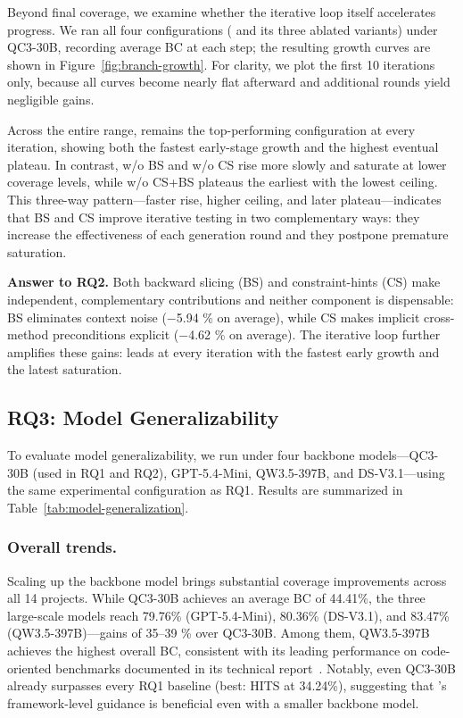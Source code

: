 Beyond final coverage, we examine whether the iterative loop itself accelerates progress. We ran all four configurations (\ourmethod{} and its three ablated variants) under QC3-30B, recording average BC at each step; the resulting growth curves are shown in Figure~\ref{fig:branch-growth}.
For clarity, we plot the first 10 iterations only, because all curves become nearly flat afterward and additional rounds yield negligible gains.

Across the entire range, \ourmethod{} remains the top-performing configuration at every iteration, showing both the fastest early-stage growth and the highest eventual plateau. 
In contrast, w/o BS and w/o CS rise more slowly and saturate at lower coverage levels, while w/o CS+BS plateaus the earliest with the lowest ceiling.
This three-way pattern---faster rise, higher ceiling, and later plateau---indicates that BS and CS improve iterative testing in two complementary ways: they increase the effectiveness of each generation round and they postpone premature saturation. 

\noindent\textbf{Answer to RQ2.}
Both backward slicing (BS) and constraint-hints (CS) make independent, complementary contributions and neither component is dispensable: 
BS eliminates context noise ($-$5.94 \% on average), while CS makes implicit cross-method preconditions explicit ($-$4.62 \% on average). 
The iterative loop further amplifies these gains: \ourmethod{} leads at every iteration with the fastest early growth and the latest saturation.

\subsection{RQ3: Model Generalizability}

To evaluate model generalizability, we run \ourmethod{} under four backbone models---QC3-30B (used in RQ1 and RQ2), GPT-5.4-Mini, QW3.5-397B, and DS-V3.1---using the same experimental configuration as RQ1. Results are summarized in Table~\ref{tab:model-generalization}.

\subsubsection{Overall trends.} 
Scaling up the backbone model brings substantial coverage improvements across all 14 projects. 
While QC3-30B achieves an average BC of 44.41\%, the three large-scale models reach 79.76\% (GPT-5.4-Mini), 80.36\% (DS-V3.1), and 83.47\% (QW3.5-397B)---gains of 35--39 \% over QC3-30B. 
Among them, QW3.5-397B achieves the highest overall BC, consistent with its leading performance on code-oriented benchmarks documented in its technical report~\cite{qwen35}. 
Notably, even QC3-30B already surpasses every RQ1 baseline (best: HITS at 34.24\%), suggesting that \ourmethod{}'s framework-level guidance is beneficial even with a smaller backbone model.

